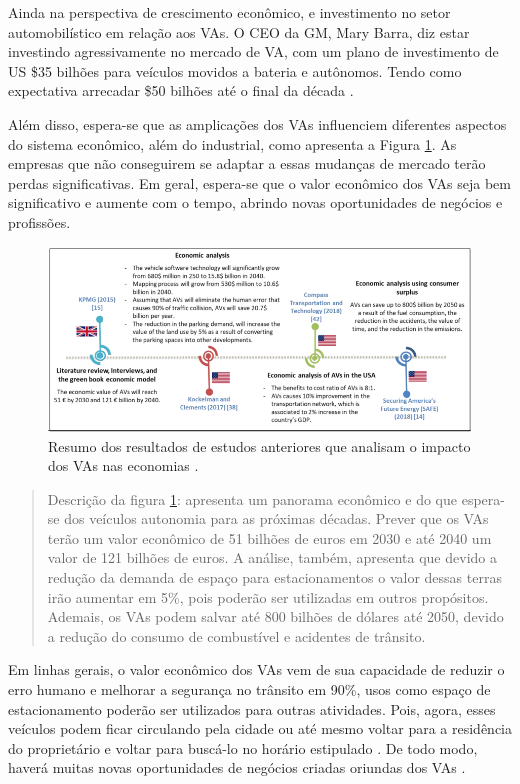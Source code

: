 Ainda na perspectiva de crescimento econômico, e investimento no setor automobilístico em relação aos VAs. O CEO da GM, Mary Barra, diz estar investindo agressivamente no mercado de VA, com um plano de investimento de US \$35 bilhões para veículos movidos a bateria e autônomos. Tendo como expectativa arrecadar \$50 bilhões até o final da década \cite{gm}.

Além disso, espera-se que as amplicações dos VAs influenciem diferentes aspectos do sistema econômico, além do industrial, como apresenta a Figura \ref{figura_resumo}. As empresas que não conseguirem se adaptar a essas mudanças 
 de mercado terão perdas significativas. Em geral, espera-se que o valor econômico dos VAs seja bem significativo e aumente com o tempo, abrindo novas oportunidades de negócios e profissões.

\begin{figure}[H]
\centering
\includegraphics[width=\textwidth]{Figures/vas-mercado.png}
\caption{Resumo dos resultados de estudos anteriores que analisam o impacto dos VAs nas economias \cite{mundobrasil}.}
\label{figura_resumo}
\end{figure}

\begin{quote}
Descrição da figura \ref{figura_resumo}: apresenta um panorama econômico e do que espera-se dos veículos autonomia para as próximas décadas. Prever que os VAs terão um valor econômico de 51 bilhões de euros em 2030 e até 2040 um valor de 121 bilhões de euros. A análise, também, apresenta que devido a redução da demanda de espaço para estacionamentos o valor dessas terras irão aumentar em 5\%, pois poderão ser utilizadas em outros propósitos. Ademais, os VAs podem salvar até 800 bilhões de dólares até 2050, devido a redução do consumo de combustível e acidentes de trânsito. 
\end{quote}

Em linhas gerais, o valor econômico dos VAs vem de sua capacidade de reduzir o erro humano e melhorar a segurança no trânsito em 90\%, usos como espaço de estacionamento poderão ser utilizados para outras atividades. Pois, agora, esses veículos podem ficar circulando pela cidade ou até mesmo voltar para a residência do proprietário e voltar para buscá-lo no horário estipulado \cite{4cenarios_ocidental}. De todo modo, haverá muitas novas oportunidades de negócios criadas oriundas dos VAs \cite{mundobrasil}.




